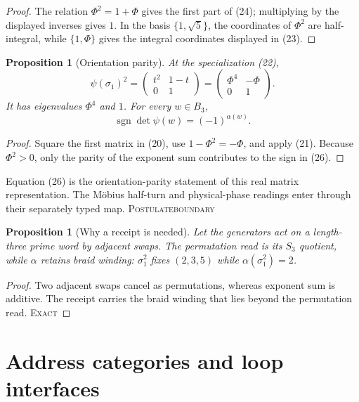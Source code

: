 \documentclass[10pt]{article}
\newtheorem{proposition}[definition]{Proposition}
\theoremstyle{remark}
\newcommand{\sgn}{\operatorname{sgn}}
\newcommand{\cstatus}[1]{\hfill\textsc{#1}}
\newcommand{\exact}{\textsc{Exact}}
\newcommand{\postulate}{\textsc{Postulate}}
\begin{document}
\begin{proof}
The relation $\Phi^2=1+\Phi$ gives the first part of (24); multiplying by
the displayed inverses gives $1$.  In the basis $\{1,\sqrt5\}$, the
coordinates of $\Phi^2$ are half-integral, while $\{1,\Phi\}$ gives the
integral coordinates displayed in (23).
\end{proof}

\begin{proposition}[Orientation parity]\label{prop:parity}
At the specialization (22),
\[
 \psi(\sigma_1)^2=
 \begin{pmatrix}t^2&1-t\\0&1\end{pmatrix}
=\begin{pmatrix}\Phi^4&-\Phi\\0&1\end{pmatrix}.
\tag{25}
\]
It has eigenvalues $\Phi^4$ and $1$.  For every $w\in B_3$,
\[
 \sgn\det\psi(w)=(-1)^{\alpha(w)}.
\tag{26}
\]
\end{proposition}

\begin{proof}
Square the first matrix in (20), use $1-\Phi^2=-\Phi$, and apply (21).
Because $\Phi^2>0$, only the parity of the exponent sum contributes to the
sign in (26).
\end{proof}

Equation (26) is the orientation-parity statement of this real matrix
representation.  The M\"obius half-turn and physical-phase readings enter
through their separately typed map. \cstatus{\postulate boundary}

\begin{proposition}[Why a receipt is needed]\label{prop:receipt}
Let the generators act on a length-three prime word by adjacent swaps.  The
permutation read is its $S_3$ quotient, while $\alpha$ retains braid winding:
$\sigma_1^2$ fixes $(2,3,5)$ while
$\alpha(\sigma_1^2)=2$.
\end{proposition}

\begin{proof}
Two adjacent swaps cancel as permutations, whereas exponent sum is additive.
The receipt carries the braid winding that lies beyond the permutation read.
\cstatus{\exact}
\end{proof}

\section{Address categories and loop interfaces}
\end{document}
